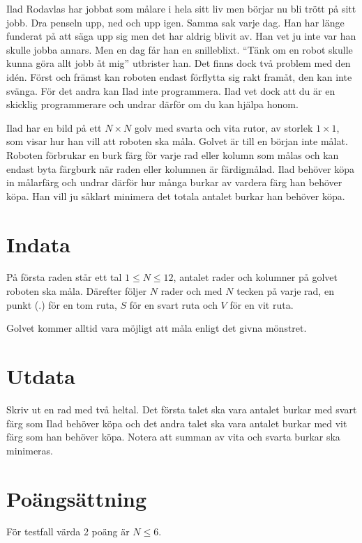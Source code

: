 Ilad Rodavlas har jobbat som målare i hela sitt liv men börjar nu bli trött på sitt jobb. Dra penseln upp, ned och upp igen. Samma sak varje dag. Han har länge funderat på att säga upp sig men det har aldrig blivit av. Han vet ju inte var han skulle jobba annars. Men en dag får han en snilleblixt. “Tänk om en robot skulle kunna göra allt jobb åt mig” utbrister han. Det finns dock två problem med den  idén. Först och främst kan roboten endast förflytta sig rakt framåt, den kan inte svänga. För det andra kan Ilad inte programmera. Ilad vet dock att du är en skicklig programmerare och undrar därför om du kan hjälpa honom. 

Ilad har en bild på ett $N \times N$ golv med svarta och vita rutor, av storlek $1 \times 1$, som visar hur han vill att roboten ska måla. Golvet är till en början inte målat. Roboten förbrukar en burk färg för varje rad eller kolumn som målas och kan endast byta färgburk när raden eller kolumnen är färdigmålad. Ilad behöver köpa in målarfärg och undrar därför hur många burkar av vardera färg han behöver köpa. Han vill ju såklart minimera det totala antalet burkar han behöver köpa. 

\section*{Indata}

På första raden står ett tal $1 \leq N \leq 12$, antalet rader och kolumner på golvet roboten ska måla. Därefter följer $N$ rader och med $N$ tecken på varje rad, en punkt ($.$) för en tom ruta, $S$ för en svart ruta och $V$ för en vit ruta.

Golvet kommer alltid vara möjligt att måla enligt det givna mönstret. 

\section*{Utdata}

Skriv ut en rad med två heltal. Det första talet ska vara antalet burkar med svart färg som Ilad behöver köpa och det andra talet ska vara antalet burkar med vit färg som han behöver köpa. Notera att summan av vita och svarta burkar ska minimeras. 

\section*{Poängsättning}
För testfall värda 2 poäng är $N \le 6$.

